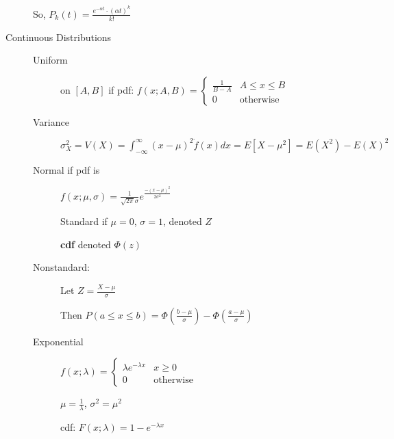 \documentclass[12pt]{letter}
\begin{document}
\begin{multicols}{2}
\begin{description}
    So, $P_k(t) = \frac{e^{-\alpha t}\cdot (\alpha t)^k}{k!}$

  \item[Continuous Distributions] 
    \begin{description}
      \item[Uniform] on $[A,B]$ if pdf: $f(x; A,B) = \begin{cases}
        \frac{1}{B-A} & A \leq x \leq B \\
        0 & \text{otherwise}
        \end{cases}$
      \item[Variance] $\sigma^2_X = V(X) = \int^\infty_{-\infty} (x - \mu)^2 \dot f(x) dx = E[X-\mu^2] = E(X^2) - E(X)^2$
      \item[Normal if pdf is] $f(x;\mu,\sigma) = \frac{1}{\sqrt{2\pi}\sigma}e^{\frac{-(x-\mu)^2}{2\sigma^2}}$
        
        Standard if $\mu = 0$, $\sigma = 1$, denoted $Z$

        \textbf{cdf} denoted $\Phi(z)$
      \item[Nonstandard:] Let $Z = \frac{X-\mu}{\sigma}$

        Then $P(a \leq x \leq b) = \Phi(\frac{b-\mu}{\sigma}) - \Phi(\frac{a-\mu}{\sigma})$

      \item[Exponential]
        $f(x; \lambda) = \begin{cases}
        \lambda e^{-\lambda x} & x \geq 0 \\
        0 & \text{otherwise}
      \end{cases}$

        $\mu = \frac{1}{\lambda}$, $\sigma^2 = \mu^2$

        cdf: $F(x; \lambda) = 1-e^{-\lambda x}$


\end{description}
\end{description}
\end{multicols}
\end{document}
